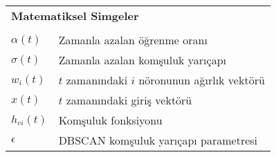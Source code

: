 \begin{spacing}{1.0}
\begin{longtable}{@{}p{} p{}@{}}
\\
\multicolumn{2}{l}{\textbf{Matematiksel Simgeler}} \\[1ex]
\\
$\alpha(t)$  &	Zamanla azalan öğrenme oranı \\[1ex]
$\sigma(t)$  &	Zamanla azalan komşuluk yarıçapı \\[1ex]
$w_i(t)$  &	$t$ zamanındaki $i$ nöronunun ağırlık vektörü \\[1ex]
$x(t)$  &	$t$ zamanındaki giriş vektörü \\[1ex]
$h_{ci}(t)$  &	Komşuluk fonksiyonu \\[1ex]
$\epsilon$ & DBSCAN komşuluk yarıçapı parametresi \\[1ex]
\end{longtable}
\end{spacing}